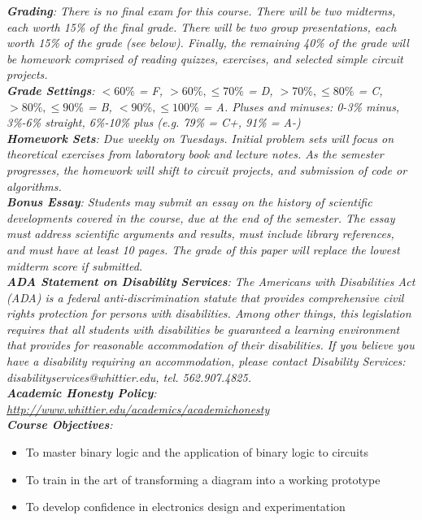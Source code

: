\documentclass[10pt]{article}
\begin{document}
\textit{\textbf{Grading}: There is no final exam for this course.  There will be two midterms, each worth 15\% of the final grade.  There will be two group presentations, each worth 15\% of the grade (see below).  Finally, the remaining 40\% of the grade will be homework comprised of reading quizzes, exercises, and selected simple circuit projects.} \\
\textit{\textbf{Grade Settings}: $<60\%$ = F, $>60\%,\leq 70\%$ = D, $>70\%,\leq80\%$ = C, $>80\%,\leq 90\%$ = B, $<90\%,\leq 100\%$ = A.  Pluses and minuses: 0-3\% minus, 3\%-6\% straight, 6\%-10\% plus (e.g. 79\% = C+, 91\% = A-)} \\
\textit{\textbf{Homework Sets}: Due weekly on Tuesdays.  Initial problem sets will focus on theoretical exercises from laboratory book and lecture notes.  As the semester progresses, the homework will shift to circuit projects, and submission of code or algorithms.} \\
\textit{\textbf{Bonus Essay}: Students may submit an essay on the history of scientific developments covered in the course, due at the end of the semester.  The essay must address scientific arguments and results, must include library references, and must have at least 10 pages.  The grade of this paper will replace the lowest midterm score if submitted.} \\
\textit{\textbf{ADA Statement on Disability Services}: The Americans with Disabilities Act (ADA) is a federal anti-discrimination statute that provides comprehensive civil rights protection for persons with disabilities. Among other things, this legislation requires that all students with disabilities be guaranteed a learning environment that provides for reasonable accommodation of their disabilities. If you believe you have a disability requiring an accommodation, please contact Disability Services: disabilityservices@whittier.edu, tel. 562.907.4825.} \\
\textit{\textbf{Academic Honesty Policy}: \url{http://www.whittier.edu/academics/academichonesty}} \\
\textit{\textbf{Course Objectives}:}
\begin{itemize}
\item To master binary logic and the application of binary logic to circuits
\item To train in the art of transforming a diagram into a working prototype
\item To develop confidence in electronics design and experimentation
\end{itemize}
\end{document}
